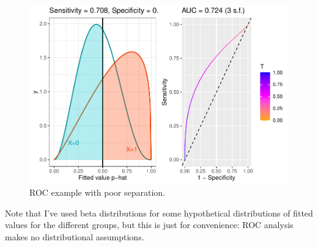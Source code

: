 \documentclass[
  openany]{book}
\theoremstyle{definition}
\theoremstyle{definition}
\theoremstyle{definition}
\theoremstyle{definition}
\theoremstyle{remark}
\begin{document}
\begin{figure}
\centering
\includegraphics{CT4H_notes_files/figure-latex/rocpoor-1.pdf}
\caption{\label{fig:rocpoor}ROC example with poor separation.}
\end{figure}

Note that I've used beta distributions for some hypothetical distributions of fitted values for the different groups, but this is just for convenience: ROC analysis makes no distributional assumptions.
\end{document}
